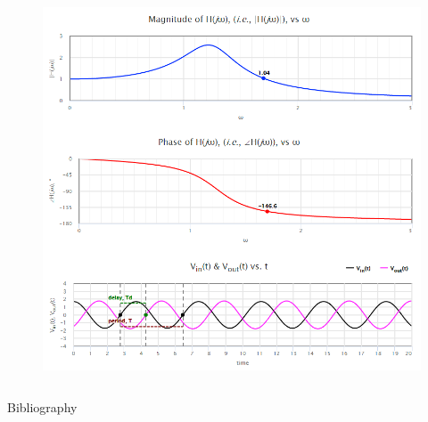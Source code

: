 \documentclass[aspectratio=169]{beamer}
\begin{document}
\begin{frame}
\begin{columns}
\begin{column}{0.4\textwidth}
\begin{figure}
				\includegraphics[width=\textwidth]{Images/bode_demo_2.png}
			\end{figure}
		\end{column}
	\end{columns}
\end{frame}

\begin{frame}[allowframebreaks]{Bibliography}
	
	
\end{frame}
\end{document}
